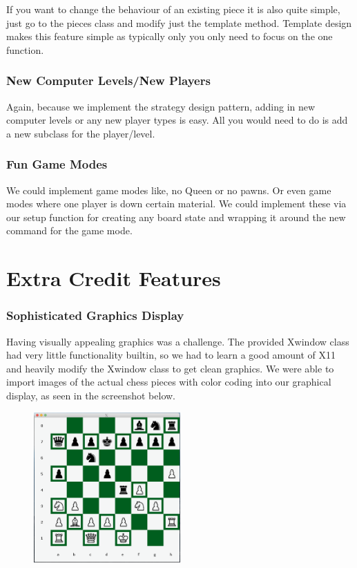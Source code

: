 \documentclass[12pt]{article}
\begin{document}
\bigskip

If you want to change the behaviour of an existing
piece it is also quite simple, just go to the pieces
class and modify just the template method. Template
design makes this feature simple as typically only you
only need to focus on the one function.
\subsubsection*{New Computer Levels/New Players}
Again, because we implement the strategy
design pattern, adding in new computer levels
or any new player types is easy. All you would 
need to do is add a new subclass for the
player/level. 

\subsubsection*{Fun Game Modes}
We could implement game modes like, no Queen
or no pawns. Or even game modes where one player
is down certain material. We could implement
these via our setup function for creating
any board state and wrapping it around
the new command for the game mode.

\section*{Extra Credit Features}
\subsubsection*{Sophisticated Graphics Display}

Having visually appealing graphics was a challenge. 
The provided Xwindow class had very little
functionality builtin, so we had to learn a good
amount of X11 and heavily modify the 
Xwindow class to get clean graphics. We were able to import images of the actual chess pieces with color coding into our graphical display, as seen in the screenshot below.

\begin{figure}[H]
	\centering
	\includegraphics[width=0.5\textwidth]{graphic.png}
	\label{}
\end{figure}
\end{document}
